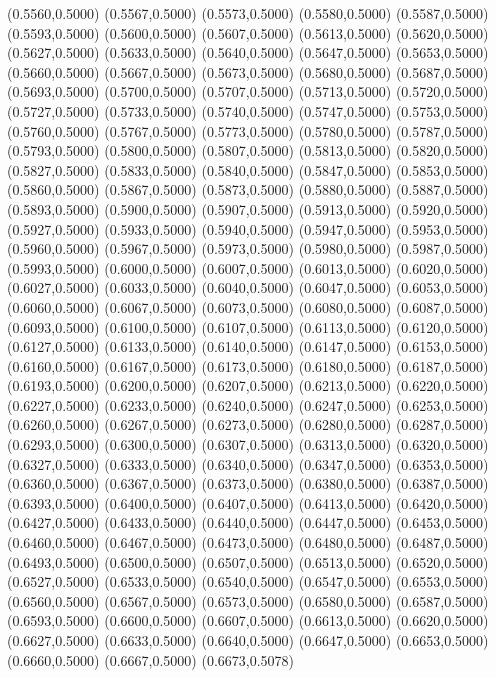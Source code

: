 {(0.5560,0.5000) (0.5567,0.5000) (0.5573,0.5000) (0.5580,0.5000) (0.5587,0.5000) (0.5593,0.5000)
(0.5600,0.5000) (0.5607,0.5000) (0.5613,0.5000) (0.5620,0.5000) (0.5627,0.5000) (0.5633,0.5000)
(0.5640,0.5000) (0.5647,0.5000) (0.5653,0.5000) (0.5660,0.5000) (0.5667,0.5000) (0.5673,0.5000)
(0.5680,0.5000) (0.5687,0.5000) (0.5693,0.5000) (0.5700,0.5000) (0.5707,0.5000) (0.5713,0.5000)
(0.5720,0.5000) (0.5727,0.5000) (0.5733,0.5000) (0.5740,0.5000) (0.5747,0.5000) (0.5753,0.5000)
(0.5760,0.5000) (0.5767,0.5000) (0.5773,0.5000) (0.5780,0.5000) (0.5787,0.5000) (0.5793,0.5000)
(0.5800,0.5000) (0.5807,0.5000) (0.5813,0.5000) (0.5820,0.5000) (0.5827,0.5000) (0.5833,0.5000)
(0.5840,0.5000) (0.5847,0.5000) (0.5853,0.5000) (0.5860,0.5000) (0.5867,0.5000) (0.5873,0.5000)
(0.5880,0.5000) (0.5887,0.5000) (0.5893,0.5000) (0.5900,0.5000) (0.5907,0.5000) (0.5913,0.5000)
(0.5920,0.5000) (0.5927,0.5000) (0.5933,0.5000) (0.5940,0.5000) (0.5947,0.5000) (0.5953,0.5000)
(0.5960,0.5000) (0.5967,0.5000) (0.5973,0.5000) (0.5980,0.5000) (0.5987,0.5000) (0.5993,0.5000)
(0.6000,0.5000) (0.6007,0.5000) (0.6013,0.5000) (0.6020,0.5000) (0.6027,0.5000) (0.6033,0.5000)
(0.6040,0.5000) (0.6047,0.5000) (0.6053,0.5000) (0.6060,0.5000) (0.6067,0.5000) (0.6073,0.5000)
(0.6080,0.5000) (0.6087,0.5000) (0.6093,0.5000) (0.6100,0.5000) (0.6107,0.5000) (0.6113,0.5000)
(0.6120,0.5000) (0.6127,0.5000) (0.6133,0.5000) (0.6140,0.5000) (0.6147,0.5000) (0.6153,0.5000)
(0.6160,0.5000) (0.6167,0.5000) (0.6173,0.5000) (0.6180,0.5000) (0.6187,0.5000) (0.6193,0.5000)
(0.6200,0.5000) (0.6207,0.5000) (0.6213,0.5000) (0.6220,0.5000) (0.6227,0.5000) (0.6233,0.5000)
(0.6240,0.5000) (0.6247,0.5000) (0.6253,0.5000) (0.6260,0.5000) (0.6267,0.5000) (0.6273,0.5000)
(0.6280,0.5000) (0.6287,0.5000) (0.6293,0.5000) (0.6300,0.5000) (0.6307,0.5000) (0.6313,0.5000)
(0.6320,0.5000) (0.6327,0.5000) (0.6333,0.5000) (0.6340,0.5000) (0.6347,0.5000) (0.6353,0.5000)
(0.6360,0.5000) (0.6367,0.5000) (0.6373,0.5000) (0.6380,0.5000) (0.6387,0.5000) (0.6393,0.5000)
(0.6400,0.5000) (0.6407,0.5000) (0.6413,0.5000) (0.6420,0.5000) (0.6427,0.5000) (0.6433,0.5000)
(0.6440,0.5000) (0.6447,0.5000) (0.6453,0.5000) (0.6460,0.5000) (0.6467,0.5000) (0.6473,0.5000)
(0.6480,0.5000) (0.6487,0.5000) (0.6493,0.5000) (0.6500,0.5000) (0.6507,0.5000) (0.6513,0.5000)
(0.6520,0.5000) (0.6527,0.5000) (0.6533,0.5000) (0.6540,0.5000) (0.6547,0.5000) (0.6553,0.5000)
(0.6560,0.5000) (0.6567,0.5000) (0.6573,0.5000) (0.6580,0.5000) (0.6587,0.5000) (0.6593,0.5000)
(0.6600,0.5000) (0.6607,0.5000) (0.6613,0.5000) (0.6620,0.5000) (0.6627,0.5000) (0.6633,0.5000)
(0.6640,0.5000) (0.6647,0.5000) (0.6653,0.5000) (0.6660,0.5000) (0.6667,0.5000) (0.6673,0.5078)
}
